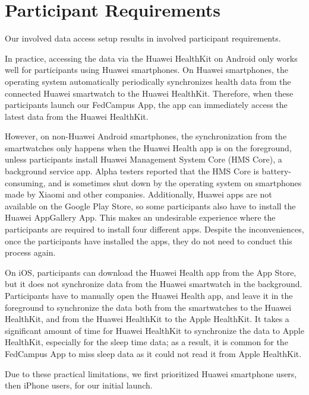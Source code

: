 \section{Participant Requirements}

Our involved data access setup results in involved participant requirements.

In practice, accessing the data via the Huawei HealthKit on Android only works
well for participants using Huawei smartphones.
On Huawei smartphones,
the operating system automatically periodically synchronizes health data from
the connected Huawei smartwatch to the Huawei HealthKit.
Therefore, when these participants launch our FedCampus App,
the app can immediately access the latest data from the Huawei HealthKit.

However, on non-Huawei Android smartphones,
the synchronization from the smartwatches only happens when
the Huawei Health app is on the foreground,
unless participants install Huawei Management System Core (HMS Core),
a background service app.
Alpha testers reported that the HMS Core is battery-consuming,
and is sometimes shut down by the operating system on smartphones made by
Xiaomi and other companies.
Additionally, Huawei apps are not available on the Google Play Store,
so some participants also have to install the Huawei AppGallery App.
This makes an undesirable experience where the participants are required to
install four different apps.
Despite the inconveniences, once the participants have installed the apps,
they do not need to conduct this process again.

On iOS, participants can download the Huawei Health app from the App Store,
but it does not synchronize data from the Huawei smartwatch in the background.
Participants have to manually open the Huawei Health app,
and leave it in the foreground to synchronize the data both from
the smartwatches to the Huawei HealthKit,
and from the Huawei HealthKit to the Apple HealthKit.
It takes a significant amount of time for Huawei HealthKit to
synchronize the data to Apple HealthKit,
especially for the sleep time data;
as a result, it is common for the FedCampus App to miss sleep data as
it could not read it from Apple HealthKit.

Due to these practical limitations,
we first prioritized Huawei smartphone users, then iPhone users,
for our initial launch.
